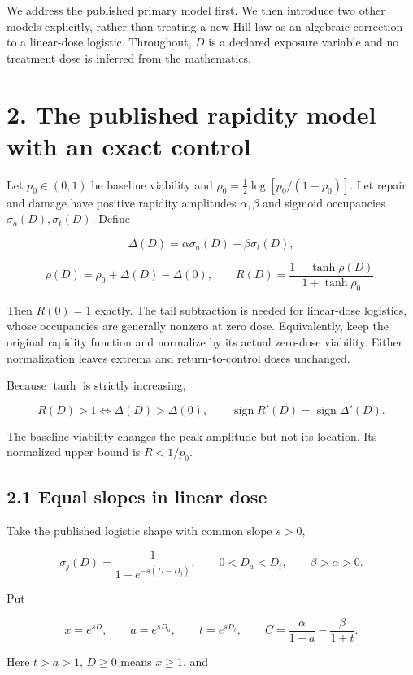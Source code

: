 \documentclass[
  11pt,
  a4paper,
]{article}
\begin{document}
We address the published primary model first. We then introduce two other models explicitly, rather than treating a new Hill law as an algebraic correction to a linear-dose logistic. Throughout, \(D\) is a declared exposure variable and no treatment dose is inferred from the mathematics.

\section{2. The published rapidity model with an exact control}\label{the-published-rapidity-model-with-an-exact-control}

Let \(p_0\in(0,1)\) be baseline viability and \(\rho_0=\tfrac12\log[p_0/(1-p_0)]\). Let repair and damage have positive rapidity amplitudes \(\alpha,\beta\) and sigmoid occupancies \(\sigma_a(D),\sigma_t(D)\). Define

\[\Delta(D)=\alpha\sigma_a(D)-\beta\sigma_t(D),\]

\[\rho(D)=\rho_0+\Delta(D)-\Delta(0),\qquad
R(D)=\frac{1+\tanh\rho(D)}{1+\tanh\rho_0}.\]

Then \(R(0)=1\) exactly. The tail subtraction is needed for linear-dose logistics, whose occupancies are generally nonzero at zero dose. Equivalently, keep the original rapidity function and normalize by its actual zero-dose viability. Either normalization leaves extrema and return-to-control doses unchanged.

Because \(\tanh\) is strictly increasing,

\[R(D)>1\iff\Delta(D)>\Delta(0),\qquad
\operatorname{sign}R'(D)=\operatorname{sign}\Delta'(D).\]

The baseline viability changes the peak amplitude but not its location. Its normalized upper bound is \(R<1/p_0\).

\subsection{2.1 Equal slopes in linear dose}\label{equal-slopes-in-linear-dose}

Take the published logistic shape with common slope \(s>0\),

\[\sigma_j(D)=\frac1{1+e^{-s(D-D_j)}},\qquad
0<D_a<D_t,\qquad\beta>\alpha>0.\]

Put

\[x=e^{sD},\qquad a=e^{sD_a},\qquad t=e^{sD_t},\qquad
C=\frac{\alpha}{1+a}-\frac{\beta}{1+t}.\]

Here \(t>a>1\), \(D\ge0\) means \(x\ge1\), and
\end{document}
